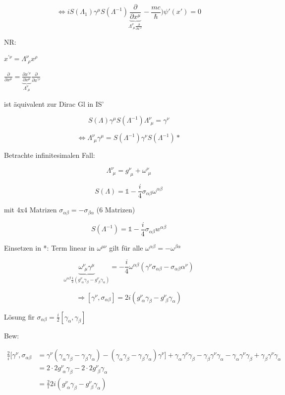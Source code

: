 \[\Leftrightarrow iS(\Lambda_1) \gamma^\mu S(\Lambda^{-1})\underbrace{\frac{\partial}{\partial x^\mu}}_{\Lambda^\nu_{\,\,\mu}\frac{\partial}{\partial x^{'\nu}}} - \frac{mc}{\hbar})\psi'(x') = 0 \]

NR:

\(x^{'\nu}=\Lambda^\nu_{\,\,\rho}x^\rho \)

\(\frac{\partial}{\partial x^\mu} =\underbrace{\frac{\partial x^{'\nu}}{\partial x^{\mu}}}_{\Lambda^\nu_{\,\,\mu}}\frac{\partial}{\partial x^{'\nu}} \)

ist äquivalent zur Dirac Gl in IS'

\[S(\Lambda)\gamma^\mu S(\Lambda^{-1})\Lambda^\nu_{\,\,\mu} = \gamma^\nu\]

\[\Leftrightarrow \boxed{ \Lambda^\nu_{\,\,\mu}\gamma^\mu = S(\Lambda^{-1})\gamma^\nu S(\Lambda^{-1})  }* \]

Betrachte infinitesimalen Fall:

\[ \Lambda^\nu_{\,\,\mu} = g^\nu_{\,\,\mu}+\omega^\nu_{\,\,\mu}  \]

\[S(\Lambda) = \mathbb 1 - \frac{i}{4} \sigma_{\alpha\beta}\omega^{\alpha\beta}\]

mit 4x4 Matrizen \(\sigma_{\alpha\beta} = - \sigma_{\beta\alpha} \) (6 Matrizen)

\[ S(\Lambda^{-1}) = \mathbb 1 - \frac{i}{4} \sigma_{\alpha\beta}w^{\alpha\beta}  \]

Einsetzen in *: Term linear in \( \omega^{\mu\nu}  \) gilt für alle \(\omega^{\alpha\beta} = -\omega^{\beta\alpha}\)

\[\underbrace{\omega^\nu_{\,\,\mu}\gamma^{\mu}}_{\omega^{\alpha\beta}\frac{1}{2}(g^{\nu}_{\,\,\alpha}\gamma_\beta -g^{\nu}_{\,\,\beta}\gamma_\alpha) } = -  \frac{i}{4}\omega^{\alpha\beta}(\gamma^\nu\sigma_{\alpha\beta}-\sigma_{\alpha\beta}\alpha^\nu) \]


\[\Rightarrow \boxed{[\gamma^\nu,\sigma_{\alpha\beta}] = 2i(g^{\nu}_{\,\,\alpha}\gamma_\beta -g^{\nu}_{\,\,\beta}\gamma_\alpha)  }\]


Lösung fir \(\sigma_{\alpha\beta} = \frac{i}{2}[\gamma_\alpha,\gamma_\beta]\)

Bew: 

\begin{align}
\frac{2}{i}[\gamma^\nu,\sigma_{\alpha\beta} &= \gamma^\nu(\gamma_\alpha\gamma_\beta - \gamma_\beta\gamma_\alpha)-(\gamma_\alpha\gamma_\beta-\gamma_\beta\gamma_\alpha)\gamma^\nu]+\gamma_\alpha\gamma^\nu\gamma_\beta - \gamma_\beta\gamma^\nu\gamma_\alpha-\gamma_\alpha\gamma^\nu\gamma_\beta + \gamma_\beta\gamma^\nu\gamma_\alpha \\
&= 2\cdot 2 g^\nu_{\,\,\alpha}\gamma_\beta - 2\cdot 2 g^\nu_{\,\,\beta}\gamma_\alpha \\
&= \frac{2}{i}2i(g^\nu_{\,\,\alpha}\gamma_\beta - g^\nu_{\,\,\beta}\gamma_\alpha)
 \end{align}


